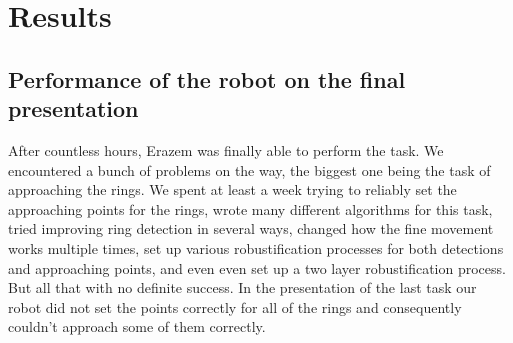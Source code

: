 \documentclass[12pt,a4paper]{article}
\begin{document}
	\section{Results}

	\subsection{Performance of the robot on the final presentation}
	After countless hours, Erazem was finally able to perform the task. We encountered a bunch of problems on the way, the biggest one being the task of approaching the rings. We spent at least a week trying to reliably set the approaching points for the rings, wrote many different algorithms for this task, tried improving ring detection in several ways, changed how the fine movement works multiple times, set up various robustification processes for both detections and approaching points, and even even set up a two layer robustification process. But all that with no definite success. In the presentation of the last task our robot did not set the points correctly for all of the rings and consequently couldn't approach some of them correctly. \\
\end{document}
